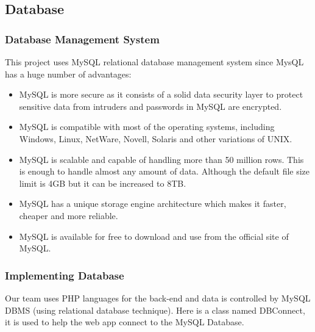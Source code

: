 \subsection{Database}
\subsubsection{Database Management System}
\noindent This project uses MySQL relational database management system since MysQL has a huge number of advantages:

\begin{itemize}
    \item MySQL is more secure as it consists of a solid data security layer to protect sensitive data from intruders and passwords in MySQL are encrypted.

    \item MySQL is compatible with most of the operating systems, including Windows, Linux, NetWare, Novell, Solaris and other variations of UNIX.

    \item MySQL is scalable and capable of handling more than 50 million rows. This is enough to handle almost any amount of data. Although the default file size limit is 4GB but it can be increased to 8TB.

    \item MySQL has a unique storage engine architecture which makes it faster, cheaper and more reliable.

    \item MySQL is available for free to download and use from the official site of MySQL.
\end{itemize}

\subsubsection{Implementing Database}
\noindent Our team uses PHP languages for the back-end and data is controlled by MySQL DBMS (using relational database technique). Here is a class named DBConnect, it is used to help the web app connect to the MySQL Database.


